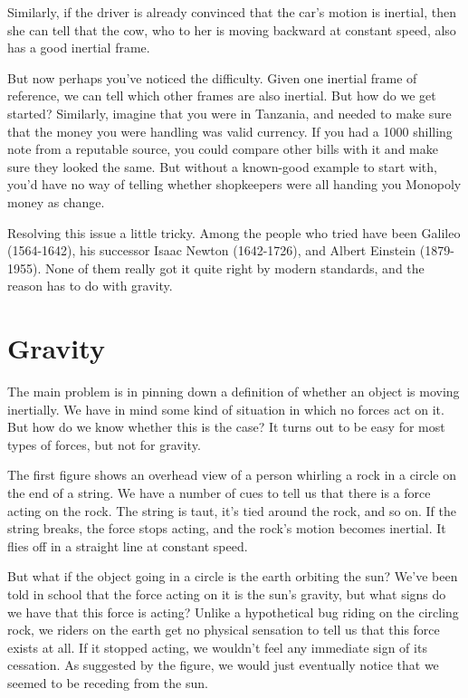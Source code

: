 Similarly, if the driver is already convinced that the car's motion is inertial, then she can tell that the cow,
who to her is moving backward at constant speed, also has a good inertial frame.

But now perhaps you've noticed the difficulty. Given one inertial frame of reference, we can tell which other
frames are also inertial. But how do we get started? Similarly, imagine that you were in Tanzania,
and needed to make sure that the money you were handling was valid currency. If you had a 1000 shilling note from
a reputable source, you could compare other bills with it and make sure they looked the same. But without a
known-good example to start with, you'd have no way of telling whether shopkeepers were all handing you Monopoly money
as change.

Resolving this issue a little tricky. Among the people who tried have been
Galileo (1564-1642), his successor Isaac Newton (1642-1726), and
Albert Einstein (1879-1955). None of them really got it quite right by modern standards, and the reason has
to do with gravity.

\vfill\pagebreak

\section{Gravity}

The main problem is in pinning down a definition of whether an object is moving inertially. We have in mind
some kind of situation in which no forces act on it. But how do we know whether this is the case?
It turns out to be easy for most types of forces, but not for gravity.

The first figure  shows an overhead view of a person whirling a rock in a circle on the end
of a string. We have a number of cues to tell us  that there is a force acting on the rock.
The string is taut, it's tied around the rock, and so on. If the string breaks, the force stops acting,
and the rock's motion becomes inertial. It flies off in a straight line at constant speed.

\begin{figure}\label{fig:rock-on-string-and-earth}
\end{figure}

But what if the object going in a circle is the earth orbiting the sun? We've been told in school
that the force acting on it is the sun's gravity, but what signs do we have that this force is acting?
Unlike a hypothetical bug riding on the circling rock, we riders on the earth get no physical sensation
to tell us that this force exists at all.
If it stopped acting, we wouldn't feel any immediate sign of its cessation.
As suggested by the figure, we would just eventually notice that we seemed to be receding from the sun.


